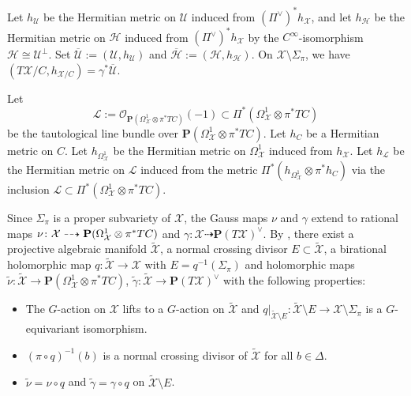\documentclass[amscd, leqno]{amsart}
\theoremstyle{plain}
\theoremstyle{definition}
\theoremstyle{remark}
\begin{document}
Let $h_{\mathcal U}$ be the Hermitian metric on ${\mathcal U}$ induced from $(\varPi^{\lor})^{*}h_{\mathcal X}$, 
and let $h_{\mathcal H}$ be the Hermitian metric on ${\mathcal H}$ induced from 
$(\varPi^{\lor})^{*}h_{\mathcal X}$ by the $C^{\infty}$-isomorphism ${\mathcal H}\cong{\mathcal U}^{\perp}$.
Set $\overline{\mathcal U}:=({\mathcal U},h_{\mathcal U})$ and $\overline{\mathcal H}:=({\mathcal H},h_{\mathcal H})$.
On ${\mathcal X}\setminus\Sigma_{\pi}$, we have
$(T{\mathcal X}/C,h_{{\mathcal X}/C})=\gamma^{*}\overline{\mathcal U}$.
\par
Let 
$$
{\mathcal L} := 
{\mathcal O}_{{\mathbf P}(\Omega^{1}_{\mathcal X}\otimes\pi^{*}TC)}(-1) \subset \varPi^{*}(\Omega^{1}_{\mathcal X}\otimes\pi^{*}TC)
$$
be the tautological line bundle over ${\mathbf P}(\Omega^{1}_{\mathcal X}\otimes\pi^{*}TC)$. Let $h_{C}$ be a Hermitian metric on $C$. 
Let $h_{\Omega^{1}_{\mathcal X}}$ be the Hermitian metric on $\Omega^{1}_{\mathcal X}$ induced from $h_{\mathcal X}$.
Let $h_{\mathcal L}$ be the Hermitian metric on ${\mathcal L}$ induced from the metric $\varPi^{*}(h_{\Omega^{1}_{\mathcal X}}\otimes\pi^{*}h_{C})$ 
via the inclusion ${\mathcal L}\subset\varPi^{*}(\Omega^{1}_{\mathcal X}\otimes\pi^{*}TC)$. 
\par
Since $\Sigma_{\pi}$ is a proper subvariety of ${\mathcal X}$, the Gauss maps $\nu$ and $\gamma$ extend to rational maps
$\nu\colon{\mathcal X}\dashrightarrow{\bf P}(\Omega^{1}_{\mathcal X}\otimes\pi^{*}TC)$
and $\gamma\colon{\mathcal X}\dashrightarrow{\mathbf P}(T{\mathcal X})^{\lor}$.
By \cite[Th.\,13.2]{BierstoneMilman97}, there exist a projective algebraic manifold $\widetilde{\mathcal X}$, 
a normal crossing divisor $E\subset\widetilde{\mathcal X}$, 
a birational holomorphic map $q\colon\widetilde{\mathcal X}\to{\mathcal X}$ with $E=q^{-1}(\Sigma_{\pi})$
and holomorphic maps 
$\widetilde{\nu}\colon\widetilde{\mathcal X} \to {\mathbf P}(\Omega^{1}_{\mathcal X}\otimes\pi^{*}TC)$,
$\widetilde{\gamma}\colon\widetilde{\mathcal X} \to {\mathbf P}(T{\mathcal X})^{\lor}$ with the following properties:
\begin{itemize}
\item[(a)]
The $G$-action on ${\mathcal X}$ lifts to a $G$-action on $\widetilde{\mathcal X}$ and 
$q|_{\widetilde{\mathcal X}\setminus E} \colon \widetilde{\mathcal X}\setminus E\to{\mathcal X}\setminus\Sigma_{\pi}$ is a $G$-equivariant isomorphism.
\item[(b)]
$(\pi\circ q)^{-1}(b)$ is a normal crossing divisor of $\widetilde{\mathcal X}$ for all $b\in\Delta$.
\item[(c)]
$\widetilde{\nu}=\nu\circ q$ and $\widetilde{\gamma}=\gamma\circ q$ on $\widetilde{\mathcal X}\setminus E$.
\end{itemize}
\end{document}
